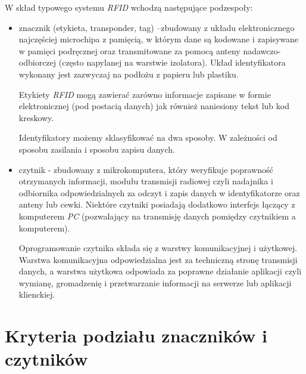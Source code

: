\noindent  
\newline W skład typowego systemu \emph{RFID} wchodzą następujące podzespoły:
\begin{itemize}\setlength{\itemsep}{0pt}

	\item znacznik  (etykieta, transponder, tag) –zbudowany z układu elektronicznego najczęściej microchipa z pamięcią, w którym dane są  kodowane i zapisywane w pamięci podręcznej oraz transmitowane za pomocą anteny nadawczo-odbiorczej (często napylanej na warstwie izolatora). Układ identyfikatora wykonany jest zazwyczaj na podłożu z papieru lub plastiku. 

	Etykiety \emph{RFID} mogą zawierać zarówno informacje zapisane w formie elektronicznej (pod postacią danych) jak również naniesiony tekst lub kod kreskowy. 

	Identyfikatory możemy sklasyfikować na dwa sposoby. W zależności od sposobu zasilania i sposobu zapisu danych. 

	\item czytnik - zbudowany z mikrokomputera, który weryfikuje poprawność otrzymanych informacji, modułu transmisji radiowej czyli nadajnika i odbiornika  odpowiedzialnych za odczyt i zapis danych w identyfikatorze oraz anteny lub cewki. Niektóre czytniki posiadają dodatkowo interfejs łączący z komputerem \emph{PC} (pozwalający na transmisję danych pomiędzy czytnikiem a komputerem).
	
	Oprogramowanie czytnika składa się z warstwy komunikacyjnej i użytkowej. Warstwa komunikacyjna odpowiedzialna jest za techniczną stronę transmisji danych, a warstwa użytkowa odpowiada za poprawne działanie aplikacji czyli wymianę, gromadzenię i przetwarzanie informacji na serwerze lub aplikacji klienckiej.


\end{itemize}



\section{Kryteria podziału znaczników i czytników}


